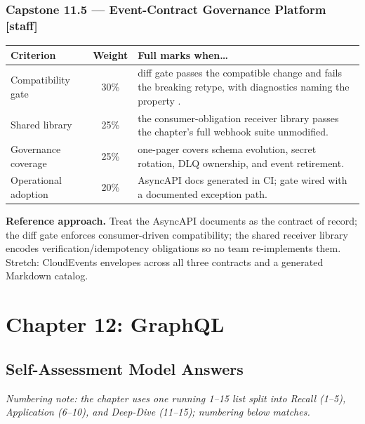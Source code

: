 \subsubsection*{Capstone 11.5 --- Event-Contract Governance Platform [staff]}
\begin{center}\small
\begin{tabularx}{\textwidth}{l c X}
\toprule
\textbf{Criterion} & \textbf{Weight} & \textbf{Full marks when\ldots} \\
\midrule
Compatibility gate & 30\% & diff gate passes the compatible change and fails the breaking retype, with diagnostics naming the property \cite{asyncapi}. \\
Shared library & 25\% & the consumer-obligation receiver library passes the chapter's full webhook suite unmodified. \\
Governance coverage & 25\% & one-pager covers schema evolution, secret rotation, DLQ ownership, and event retirement. \\
Operational adoption & 20\% & AsyncAPI docs generated in CI; gate wired with a documented exception path. \\
\bottomrule
\end{tabularx}
\end{center}
\textbf{Reference approach.} Treat the AsyncAPI documents as the contract
of record; the diff gate enforces consumer-driven compatibility; the shared
receiver library encodes verification/idempotency obligations so no team
re-implements them. Stretch: CloudEvents envelopes across all three
contracts and a generated Markdown catalog.

\section{Chapter 12: GraphQL}
\label{sec:sol-ch12}

\subsection{Self-Assessment Model Answers}

\emph{Numbering note: the chapter uses one running 1--15 list split into
Recall (1--5), Application (6--10), and Deep-Dive (11--15); numbering below
matches.}

